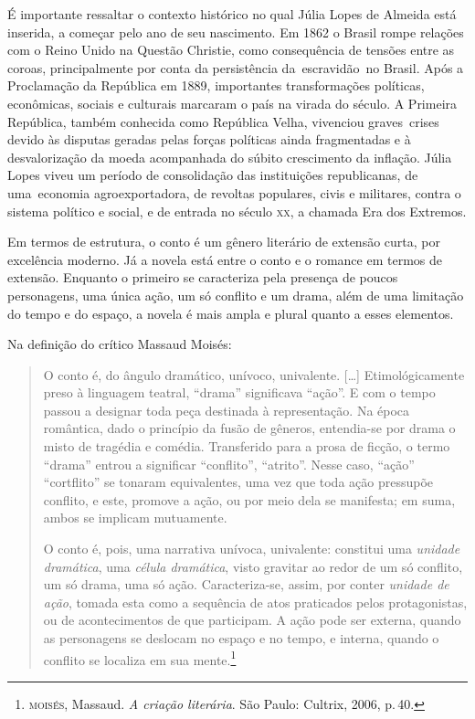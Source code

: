 É importante ressaltar o contexto histórico no qual Júlia Lopes de
Almeida está inserida, a começar pelo ano de seu nascimento. Em 1862 o
Brasil rompe relações com o Reino Unido na Questão Christie, como
consequência de tensões entre as coroas, principalmente por conta da
persistência da~escravidão~no Brasil. Após a Proclamação da República em
1889, importantes transformações políticas, econômicas, sociais e
culturais marcaram o país na virada do século. A Primeira República,
também conhecida como República Velha, vivenciou graves~crises devido às
disputas geradas pelas forças políticas ainda fragmentadas e à
desvalorização da moeda acompanhada do súbito crescimento da inflação.
Júlia Lopes viveu um período de consolidação das instituições
republicanas, de uma~economia agroexportadora, de revoltas populares,
civis e militares, contra o sistema político e social, e de entrada no
século \textsc{xx}, a chamada Era dos Extremos.

Em termos de estrutura, o conto é um gênero literário de extensão curta, por excelência moderno. Já a novela está entre o conto e o
romance em termos de extensão. Enquanto o primeiro se caracteriza pela
presença de poucos personagens, uma única ação, um só conflito e um
drama, além de uma limitação do tempo e do espaço, a novela é mais ampla
e plural quanto a esses elementos.

Na definição do crítico Massaud Moisés:

\begin{quote}
O conto é, do ângulo dramático, unívoco, univalente. [\ldots]
Etimológicamente preso à linguagem teatral,
``drama'' significava ``ação''. E com o tempo passou a designar
toda peça destinada à representação. Na época romântica, dado o
princípio da fusão de gêneros, entendia-se por drama o misto de
tragédia e comédia. Transferido para a prosa de ficção, o termo
``drama'' entrou a significar ``conflito'', ``atrito''. Nesse caso,
``ação'' ``cortflito'' se tonaram equivalentes, uma vez que toda
ação pressupõe conflito, e este, promove a ação, ou por meio dela
se manifesta; em suma, ambos se implicam mutuamente.

O conto é, pois, uma narrativa unívoca, univalente: constitui
uma \textit{unidade dramática}, uma \textit{célula dramática}, visto gravitar ao
redor de um só conflito, um só drama, uma só ação. Caracteriza-se,
assim, por conter \textit{unidade de ação}, tomada esta como a sequência de atos praticados pelos protagonistas, ou de acontecimentos de
que participam. A ação pode ser externa, quando as personagens se
deslocam no espaço e no tempo, e interna, quando o conflito se
localiza em sua mente.\footnote{\textsc{moisés}, Massaud. \textit{A criação literária}. São Paulo: Cultrix, 2006, p.\,40.}
\end{quote}

